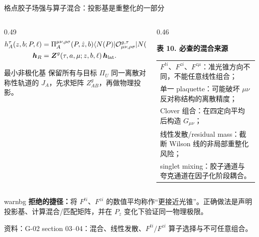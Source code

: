 \documentclass[UTF8,aspectratio=169,11pt]{ctexbeamer}
\newcommand{\source}[1]{%
  \par\vspace{-0.08em}%
  \noindent\parbox[t]{0.97\linewidth}{\raggedright\scriptsize\color{muted}资料：#1}\par}
\begin{document}
\begin{frame}[t]{格点胶子场强与算子混合：投影基是重整化的一部分}
  \begin{columns}[T,totalwidth=\textwidth]
    \begin{column}{0.49\textwidth}
      {\scriptsize
      \begin{align*}
        h_A^\tau(z,b;P,\ell)
        &=\Pi_A^{\mu\nu,\rho\sigma}(P,\hat z,b)
        \langle N(P)|\mathcal O_{\mu\nu,\rho\sigma}^{g,\tau}|N(P)\rangle,\\
        \boldsymbol h_R&=\boldsymbol Z^g(\tau,a,\mu;z,b,\ell)\,
        \boldsymbol h_{\rm lat}.
      \end{align*}}
      \begin{block}{最小非极化基}
        保留所有与目标 $\Pi_U$ 同一离散对称性轨道的 $J_A$，先求矩阵 $Z^g_{AB}$，再做物理投影。
      \end{block}
    \end{column}
    \begin{column}{0.46\textwidth}
      \begin{center}
      \textbf{表 10. 必查的混合来源}
      \vspace{0.12em}
      {\scriptsize\begin{tabular}{@{}p{\linewidth}@{}}
        \toprule
        $F^{ti}$、$F^{zi}$、$F^{z\mu}$：准光锥方向不同，不能任意线性组合；\\
        单一 plaquette：可能破坏 $\mu\nu$ 反对称结构的离散精度；\\
        Clover 组合：在四定向平均后构造 $G_{\mu\nu}$；\\
        线性发散/residual mass：截断 Wilson 线的非局部重整化风险；\\
        singlet mixing：胶子通道与夸克通道在因子化阶段耦合。\\
        \bottomrule
      \end{tabular}}
      \end{center}
    \end{column}
  \end{columns}
  \vspace{0.2em}
  \begin{beamercolorbox}[wd=0.96\textwidth,sep=0.45em,rounded=true]{warnbg}
    \textbf{拒绝的捷径：}将 $F^{ti}$、$F^{zi}$ 的数值平均称作“更接近光锥”。正确做法是声明投影基、计算混合/匹配矩阵，并在 $P_z$ 变化下验证同一物理极限。
  \end{beamercolorbox}
  \source{G-02 section 03--04：混合、线性发散、$F^{ti}/F^{zi}$ 算子选择与不可任意组合。}
\end{frame}
\end{document}
